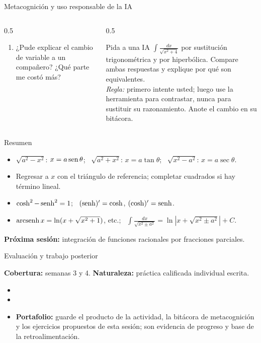 \documentclass[10pt,aspectratio=169]{beamer}
\begin{document}
\begin{frame}{Metacognición y uso responsable de la IA}
  \small
  \begin{columns}[t]
    \begin{column}{0.5\textwidth}
      \begin{metacog}
        \begin{enumerate}
          \metacomun
          \item ¿Pude explicar el cambio de variable a un compañero? ¿Qué parte me costó más?
        \end{enumerate}
      \end{metacog}
    \end{column}
    \begin{column}{0.5\textwidth}
      \begin{iabox}
        Pida a una IA $\int\frac{dx}{\sqrt{x^2+4}}$ por sustitución trigonométrica y por hiperbólica. Compare ambas respuestas y explique por qué son equivalentes.\\[2pt]
        \textit{Regla:} primero intente usted; luego use la herramienta para contrastar, nunca para sustituir su razonamiento. Anote el cambio en su bitácora.
      \end{iabox}
    \end{column}
  \end{columns}
\end{frame}

\begin{frame}{Resumen}
  \begin{itemize}
    \item $\sqrt{a^2-x^2}$: $x=a\operatorname{sen}\theta$; \ $\sqrt{a^2+x^2}$: $x=a\tan\theta$; \ $\sqrt{x^2-a^2}$: $x=a\sec\theta$.
    \item Regresar a $x$ con el triángulo de referencia; completar cuadrados si hay término lineal.
    \item $\cosh^2-\operatorname{senh}^2=1$; \ $(\operatorname{senh})'=\cosh$, $(\cosh)'=\operatorname{senh}$.
    \item $\operatorname{arcsenh} x=\ln(x+\sqrt{x^2+1})$, etc.; \ $\int\frac{dx}{\sqrt{x^2\pm a^2}}=\ln|x+\sqrt{x^2\pm a^2}|+C$.
  \end{itemize}
  \vspace{3mm}
  \textbf{Próxima sesión:} integración de funciones racionales por fracciones parciales.
\end{frame}


\begin{frame}{Evaluación y trabajo posterior}
  \small
  \begin{evalbox}
    \textbf{Cobertura:} semanas 3 y 4. \textbf{Naturaleza:} práctica calificada individual escrita.
  \end{evalbox}
  \begin{itemize}
    \item \criterios
    \item \declaracionia
    \item \textbf{Portafolio:} guarde el producto de la actividad, la bitácora de metacognición y los ejercicios propuestos de esta sesión; son evidencia de progreso y base de la retroalimentación.
  \end{itemize}
\end{frame}
\end{document}
